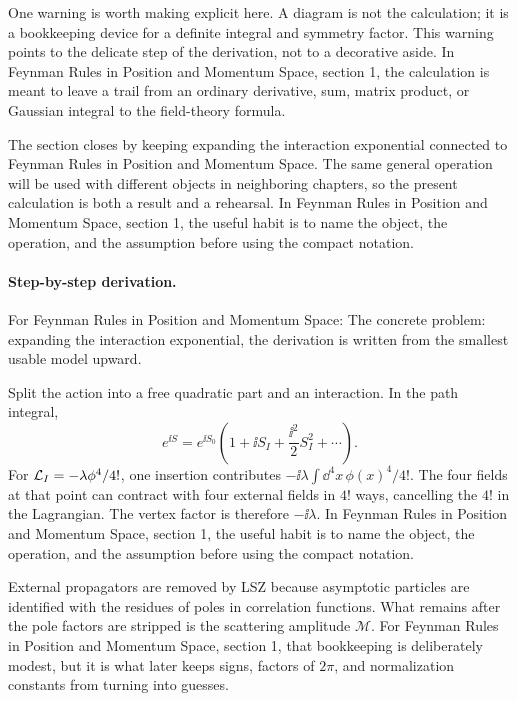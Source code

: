 One warning is worth making explicit here.  A diagram is not the calculation; it is a bookkeeping device for a definite integral and symmetry factor.  This warning points to the delicate step of the derivation, not to a decorative aside.  In Feynman Rules in Position and Momentum Space, section 1, the calculation is meant to leave a trail from an ordinary derivative, sum, matrix product, or Gaussian integral to the field-theory formula.

The section closes by keeping expanding the interaction exponential connected to Feynman Rules in Position and Momentum Space.  The same general operation will be used with different objects in neighboring chapters, so the present calculation is both a result and a rehearsal.  In Feynman Rules in Position and Momentum Space, section 1, the useful habit is to name the object, the operation, and the assumption before using the compact notation.



\paragraph{Step-by-step derivation.}

For Feynman Rules in Position and Momentum Space: The concrete problem: expanding the interaction exponential, the derivation is written from the smallest usable model upward.

Split the action into a free quadratic part and an interaction.  In the path integral,
\[
  e^{\ii S}=e^{\ii S_0}\left(1+\ii S_I+\frac{\ii^2}{2}S_I^2+\cdots\right).
\]
For \(\mathcal L_I=-\lambda\phi^4/4!\), one insertion contributes \(-\ii\lambda\int\dd^4x\,\phi(x)^4/4!\).  The four fields at that point can contract with four external fields in \(4!\) ways, cancelling the \(4!\) in the Lagrangian.  The vertex factor is therefore \(-\ii\lambda\).  In Feynman Rules in Position and Momentum Space, section 1, the useful habit is to name the object, the operation, and the assumption before using the compact notation.

External propagators are removed by LSZ because asymptotic particles are identified with the residues of poles in correlation functions.  What remains after the pole factors are stripped is the scattering amplitude \(\mathcal M\).  For Feynman Rules in Position and Momentum Space, section 1, that bookkeeping is deliberately modest, but it is what later keeps signs, factors of \(2\pi\), and normalization constants from turning into guesses.


